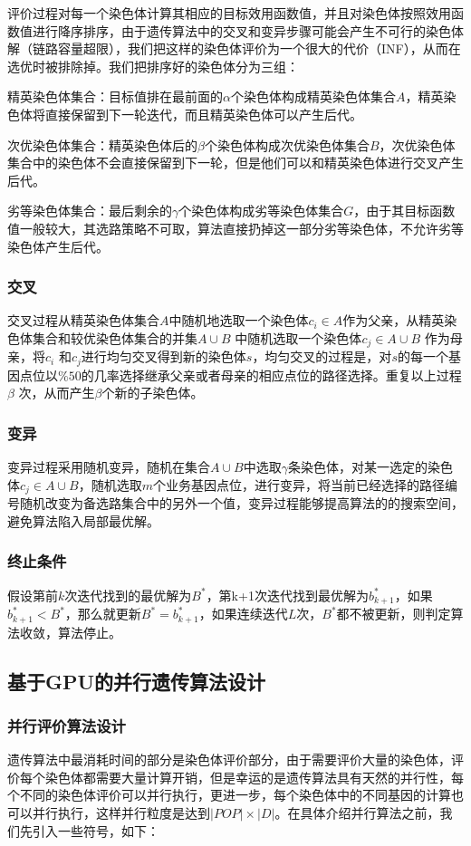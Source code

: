 评价过程对每一个染色体计算其相应的目标效用函数值，并且对染色体按照效用函数值进行降序排序，由于遗传算法中的交叉和变异步骤可能会产生不可行的染色体解（链路容量超限），我们把这样的染色体评价为一个很大的代价（INF），从而在选优时被排除掉。我们把排序好的染色体分为三组：

精英染色体集合：目标值排在最前面的$\alpha$个染色体构成精英染色体集合$A$，精英染色体将直接保留到下一轮迭代，而且精英染色体可以产生后代。

次优染色体集合：精英染色体后的$\beta$个染色体构成次优染色体集合$B$，次优染色体集合中的染色体不会直接保留到下一轮，但是他们可以和精英染色体进行交叉产生后代。

劣等染色体集合：最后剩余的$\gamma$个染色体构成劣等染色体集合$G$，由于其目标函数值一般较大，其选路策略不可取，算法直接扔掉这一部分劣等染色体，不允许劣等染色体产生后代。
\subsubsection{交叉}
交叉过程从精英染色体集合$A$中随机地选取一个染色体$c_i \in A$作为父亲，从精英染色体集合和较优染色体集合的并集$A \cup B$ 中随机选取一个染色体$c_j \in A \cup B$ 作为母亲，将$c_i$ 和$c_j$进行均匀交叉得到新的染色体$s$，均匀交叉的过程是，对$s$的每一个基因点位以$\%50$的几率选择继承父亲或者母亲的相应点位的路径选择。重复以上过程$\beta$ 次，从而产生$\beta$个新的子染色体。
\subsubsection{变异}
变异过程采用随机变异，随机在集合$A \cup B$中选取$\gamma$条染色体，对某一选定的染色体$c_j \in A \cup B$，随机选取$m$个业务基因点位，进行变异，将当前已经选择的路径编号随机改变为备选路集合中的另外一个值，变异过程能够提高算法的的搜索空间，避免算法陷入局部最优解。
\subsubsection{终止条件}
假设第前$k$次迭代找到的最优解为$B^*$，第k+1次迭代找到最优解为$b_{k+1}^*$，如果$b_{k+1}^*<B^*$，那么就更新$B^*=b_{k+1}^*$，如果连续迭代$L$次，$B^*$都不被更新，则判定算法收敛，算法停止。
\subsection{基于GPU的并行遗传算法设计}
\subsubsection{并行评价算法设计}
遗传算法中最消耗时间的部分是染色体评价部分，由于需要评价大量的染色体，评价每个染色体都需要大量计算开销，但是幸运的是遗传算法具有天然的并行性，每个不同的染色体评价可以并行执行，更进一步，每个染色体中的不同基因的计算也可以并行执行，这样并行粒度是达到$|POP|\times|D|$。在具体介绍并行算法之前，我们先引入一些符号，如下：

